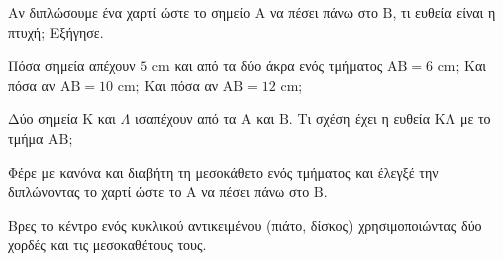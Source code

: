 \ex Αν διπλώσουμε ένα χαρτί ώστε το σημείο $\mathrm{Α}$ να πέσει πάνω στο $\mathrm{Β}$, τι ευθεία είναι η πτυχή; Εξήγησε.

\ex Πόσα σημεία απέχουν $5$ cm και από τα δύο άκρα ενός τμήματος $\mathrm{ΑΒ}=6$ cm; Και πόσα αν $\mathrm{ΑΒ}=10$ cm; Και πόσα αν $\mathrm{ΑΒ}=12$ cm;

\ex Δύο σημεία $\mathrm{Κ}$ και $\Lambda$ ισαπέχουν από τα $\mathrm{Α}$ και $\mathrm{Β}$. Τι σχέση έχει η ευθεία $\mathrm{ΚΛ}$ με το τμήμα $\mathrm{ΑΒ}$;


\ex Φέρε με κανόνα και διαβήτη τη μεσοκάθετο ενός τμήματος και έλεγξέ την διπλώνοντας το χαρτί ώστε το $\mathrm{Α}$ να πέσει πάνω στο $\mathrm{Β}$.

\ex Βρες το κέντρο ενός κυκλικού αντικειμένου (πιάτο, δίσκος) χρησιμοποιώντας δύο χορδές και τις μεσοκαθέτους τους.
